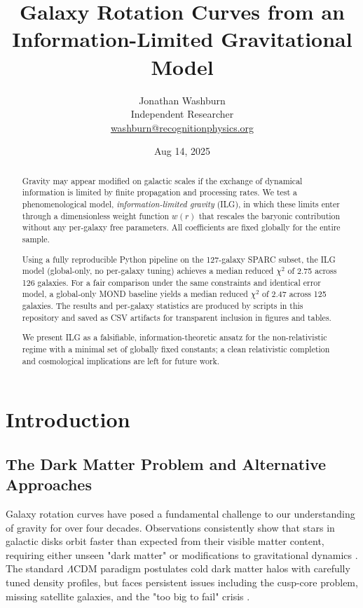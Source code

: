 \documentclass[12pt,a4paper]{article}
\title{Galaxy Rotation Curves from an Information-Limited Gravitational Model}
\author{Jonathan Washburn\\
Independent Researcher\\
\href{mailto:washburn@recognitionphysics.org}{washburn@recognitionphysics.org}}
\date{Aug 14, 2025}
\begin{document}
\maketitle

\begin{abstract}
Gravity may appear modified on galactic scales if the exchange of dynamical information is limited by finite propagation and processing rates. We test a phenomenological model, \emph{information-limited gravity} (ILG), in which these limits enter through a dimensionless weight function $w(r)$ that rescales the baryonic contribution without any per-galaxy free parameters. All coefficients are fixed globally for the entire sample.

Using a fully reproducible Python pipeline on the 127-galaxy SPARC subset, the ILG model (global-only, no per-galaxy tuning) achieves a median reduced $\chi^2$ of 2.75 across 126 galaxies. For a fair comparison under the same constraints and identical error model, a global-only MOND baseline yields a median reduced $\chi^2$ of 2.47 across 125 galaxies. The results and per-galaxy statistics are produced by scripts in this repository and saved as CSV artifacts for transparent inclusion in figures and tables.

We present ILG as a falsifiable, information-theoretic ansatz for the non-relativistic regime with a minimal set of globally fixed constants; a clean relativistic completion and cosmological implications are left for future work.
\end{abstract}

\section{Introduction}

\subsection{The Dark Matter Problem and Alternative Approaches}

Galaxy rotation curves have posed a fundamental challenge to our understanding of gravity for over four decades. Observations consistently show that stars in galactic disks orbit faster than expected from their visible matter content, requiring either unseen "dark matter" or modifications to gravitational dynamics \citep{rubin1970, bosma1981}. The standard $\Lambda$CDM paradigm postulates cold dark matter halos with carefully tuned density profiles, but faces persistent issues including the cusp-core problem, missing satellite galaxies, and the "too big to fail" crisis \citep{bullock2017, boylan2013}.
\end{document}
